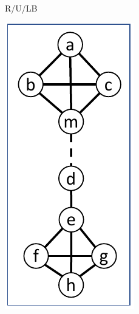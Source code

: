 \documentclass{article}
\begin{document}
\begin{figure}[t]
\begin{subfigure}{0.09\textwidth}
            \caption{R/U/LB}
            \label{fig:distance1_util_unsafe_remove_LB}
        \end{subfigure}
        \hfill
        \begin{subfigure}{0.09\textwidth}
            \centering
            \includegraphics[page=1,width=\textwidth]{Graphs/Distance_1_paper.pdf}

\end{subfigure}
\end{figure}
\end{document}
